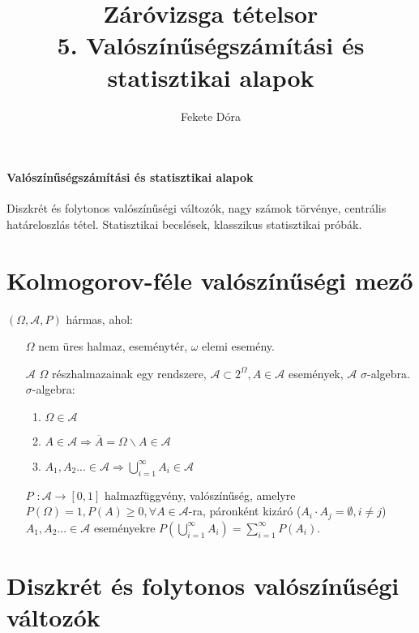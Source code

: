\documentclass[margin=0px]{article}
\title{Záróvizsga tételsor \\ \large 5. Valószínűségszámítási és statisztikai alapok}
\date{}
\author{Fekete Dóra}
\newenvironment{tetel}[1]{\paragraph{#1 \\}}{}
\begin{document}
	\maketitle
	
	\begin{tetel}{Valószínűségszámítási és statisztikai alapok}
			Diszkrét és folytonos valószínűségi változók, nagy számok törvénye, centrális határeloszlás tétel. Statisztikai becslések, klasszikus statisztikai próbák.
	\end{tetel}
	
	\section{Kolmogorov-féle valószínűségi mező}
	
	$(\Omega, \mathcal{A}, P)$ hármas, ahol:
	\begin{itemize}
		\item [$\Omega$] nem üres halmaz, eseménytér, $\omega$ elemi esemény.
		\item [$\mathcal{A}$] $\Omega$ részhalmazainak egy rendszere, $\mathcal{A} \subset 2^{\Omega}, A \in \mathcal{A}$ események, $\mathcal{A}$ $\sigma$-algebra. \\
		$\sigma$-algebra:
		\begin{enumerate}
			\item $\Omega \in \mathcal{A}$
			\item $A \in \mathcal{A} \Rightarrow \overline{A} = \Omega \backslash A \in \mathcal{A}$
			\item $A_{1}, A_{2}... \in \mathcal{A} \Rightarrow \bigcup_{i=1}^{\infty}{A_{i}} \in \mathcal{A}$
		\end{enumerate}
		\item [$P$] $: \mathcal{A} \to [0,1]$ halmazfüggvény, valószínűség, amelyre $P(\Omega) = 1, P(A) \geq 0, \forall A \in \mathcal{A}$-ra, páronként kizáró ($A_{i} \cdot A_{j} = \emptyset, i \neq j$) $A_{1}, A_{2}... \in \mathcal{A}$ eseményekre $P(\bigcup_{i=1}^{\infty}{A_{i}}) = \sum_{i=1}^{\infty}{P(A_{i})}$.
	\end{itemize}
	
	\section{Diszkrét és folytonos valószínűségi változók}
	
\end{document}
